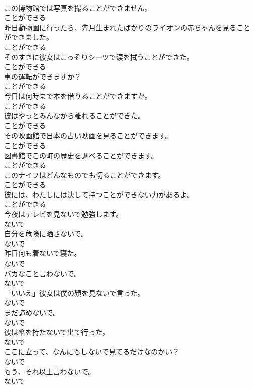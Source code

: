 \documentclass[8pt]{extreport}
\begin{document}
\begin{CJK}{UTF8}{min}
\\	この博物館では写真を撮ることができません。	
\\	ことができる
\\	昨日動物園に行ったら、先月生まれたばかりのライオンの赤ちゃんを見ることができました。	
\\	ことができる
\\	そのすきに彼女はこっそりシーツで涙を拭うことができた。	
\\	ことができる
\\	車の運転ができますか？	
\\	ことができる
\\	今日は何時まで本を借りることができますか。	
\\	ことができる
\\	彼はやっとみんなから離れることができた。	
\\	ことができる
\\	その映画館で日本の古い映画を見ることができます。	
\\	ことができる
\\	図書館でこの町の歴史を調べることができます。	
\\	ことができる
\\	このナイフはどんなものでも切ることができます。	
\\	ことができる
\\	彼には、わたしには決して持つことができない力があるよ。	
\\	ことができる
\\	今夜はテレビを見ないで勉強します。	
\\	ないで
\\	自分を危険に晒さないで。	
\\	ないで
\\	昨日何も着ないで寝た。	
\\	ないで
\\	バカなこと言わないで。	
\\	ないで
\\	「いいえ」彼女は僕の顔を見ないで言った。	
\\	ないで
\\	まだ諦めないで。	
\\	ないで
\\	彼は傘を持たないで出て行った。	
\\	ないで
\\	ここに立って、なんにもしないで見てるだけなのかい？	
\\	ないで
\\	もう、それ以上言わないで。	
\\	ないで

\end{CJK}
\end{document}
